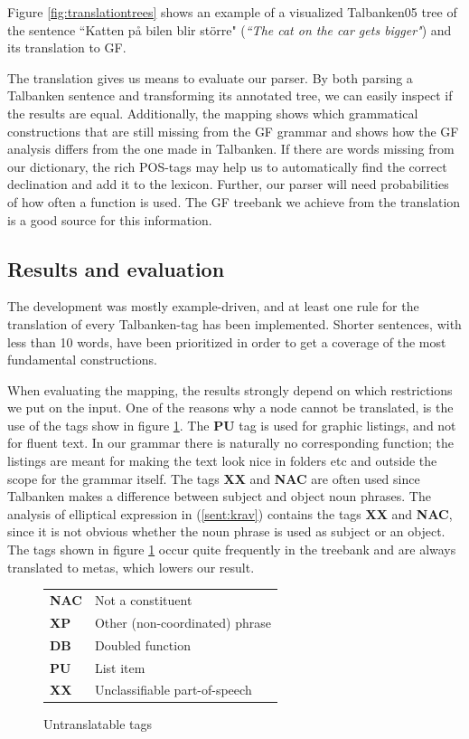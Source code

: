 \documentclass[10pt, a4paper]{article}
\begin{document}
Figure \ref{fig:translationtrees} shows an example of a visualized Talbanken05 tree
of the sentence ``Katten p{\aa} bilen blir st{\"o}rre" 
(\emph{``The cat on the car gets bigger"}) and its translation to GF.

The translation 
gives us means to evaluate our parser. By both parsing a Talbanken sentence and
transforming its annotated tree, we can easily inspect if the results are
equal.
Additionally, the mapping shows which grammatical constructions that are still missing
from the GF grammar and shows how the GF analysis differs from the one made
in Talbanken.
If there are words missing from our dictionary, the rich
POS-tags may help us to automatically find the correct declination and add it to the
lexicon. Further, our parser will need probabilities of how often a function is
used. The GF treebank we achieve from the translation is a good source for this
information.\\

\subsection{Results and evaluation}
The development was mostly example-driven, and at least one rule for the translation of
every Talbanken-tag has been implemented.
Shorter sentences, with less than 10 words, have been prioritized in order to
get a coverage of the most fundamental constructions. 

When evaluating the mapping, the results strongly depend on which restrictions we
put on the input. 
One of the reasons why a node cannot be translated, is the 
use of the tags show in figure \ref{fig:mapBadtag}.
The \textbf{PU} tag is used for graphic listings, and not for fluent text.
In our grammar there is naturally no corresponding function; 
the listings are meant for making the text look nice in
folders etc and outside the scope for the grammar itself. The tags \textbf{XX}
and \textbf{NAC} are often used since Talbanken makes a
difference between subject
and object noun phrases.
The analysis of elliptical expression in (\ref{sent:krav})
\label{sent:krav}
contains the tags \textbf{XX} and \textbf{NAC}, since it is not obvious
whether the noun phrase is used as subject or an object.
The tags shown in figure \ref{fig:mapBadtag} occur quite frequently in the treebank and are always translated
to metas, which lowers our result. \\
\begin{figure}[h]
\begin{tabular}{ll}
\textbf{NAC} & Not a constituent\\
\textbf{XP} & Other (non-coordinated) phrase\\
\textbf{DB} & Doubled function\\
\textbf{PU} & List item\\
\textbf{XX} & Unclassifiable part-of-speech\\
\end{tabular}
\caption{Untranslatable tags}\label{fig:mapBadtag}
\end{figure}
\end{document}
